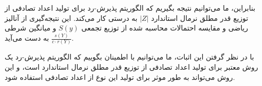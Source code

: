 بنابراین، ما می‌توانیم نتیجه بگیریم که الگوریتم پذیرش-رد برای تولید اعداد تصادفی از توزیع قدر مطلق نرمال استاندارد \( |Z| \) به درستی کار می‌کند. این نتیجه‌گیری از آنالیز ریاضی و مقایسه احتمالات محاسبه شده از توزیع تجمعی \( S(y) \) و میانگین شرطی \( \frac{s(Y)}{c \cdot r(Y)} \) به دست می‌آید.

با در نظر گرفتن این اثبات، ما می‌توانیم با اطمینان بگوییم که الگوریتم پذیرش-رد یک روش معتبر برای تولید اعداد تصادفی از توزیع قدر مطلق نرمال استاندارد است، و این روش می‌تواند به طور موثر برای تولید این نوع از اعداد تصادفی استفاده شود.
